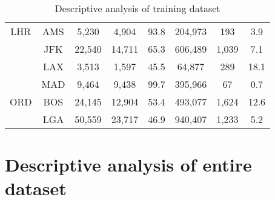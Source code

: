 \begin{table}[h]
\begin{tabular}{c c | c c c | c | c c}
LHR  &  AMS  &   5,230  &   4,904  &  93.8  &  204,973  &    193  &   3.9 \\
~    &  JFK  &  22,540  &  14,711  &  65.3  &  606,489  &  1,039  &   7.1 \\
~    &  LAX  &   3,513  &   1,597  &  45.5  &   64,877  &    289  &  18.1 \\
~    &  MAD  &   9,464  &   9,438  &  99.7  &  395,966  &     67  &   0.7 \\[.5ex]
ORD  &  BOS  &  24,145  &  12,904  &  53.4  &  493,077  &  1,624  &  12.6 \\
~    &  LGA  &  50,559  &  23,717  &  46.9  &  940,407  &  1,233  &   5.2 \\
\bottomrule
\end{tabular}
\caption{Descriptive analysis of training dataset}
\label{tbl:DescriptiveAnalysisTrainingDataset}
\end{table}


\chapter{Descriptive analysis of entire dataset}
\label{app:DescAnalysisAll}

